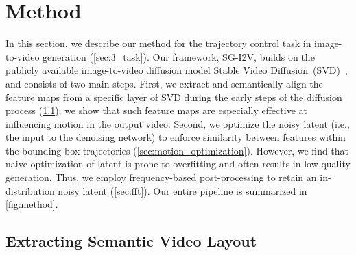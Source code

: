 

\section{Method}
\label{sec:method}

In this section, we describe our method for the trajectory control task in image-to-video generation (\cref{sec:3_task}).
Our framework, SG-I2V, builds on the publicly available image-to-video diffusion model Stable Video Diffusion~(SVD)~\citep{blattmann2023stable},
and consists of two main steps. 
First, we extract and semantically align the feature maps from a specific layer of SVD during the early steps of the diffusion process (\cref{sec:motion_estimation}); we show that such feature maps are especially effective at influencing motion in the output video.
Second, we optimize the noisy latent (i.e., the input to the denoising network) to enforce similarity between features within the bounding box trajectories (\cref{sec:motion_optimization}).
However, we find that naive optimization of latent is prone to overfitting and often results in low-quality generation.
Thus, we employ frequency-based post-processing to retain an in-distribution noisy latent (\cref{sec:fft}).
Our entire pipeline is summarized in \cref{fig:method}.



\subsection{Extracting Semantic Video Layout}
\label{sec:motion_estimation}
